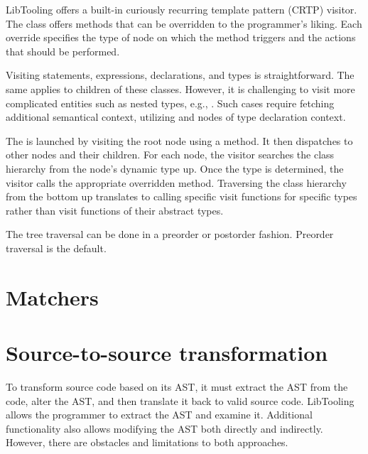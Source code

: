 LibTooling offers a built-in curiously recurring template pattern 
(CRTP) visitor. 
The class  offers  methods that 
can be overridden to the programmer's liking. 
Each override specifies the type of node on which the method 
triggers and the actions that should be performed.


Visiting statements, expressions, declarations, 
and types is straightforward. 
The same applies to children of these classes. 
However, it is challenging to visit more complicated entities 
such as nested types, e.g., . 
Such cases require fetching additional semantical context, 
utilizing  and nodes of type declaration context.


The  is launched by visiting the root node using 
a  method. 
It then dispatches to other nodes and their children. 
For each node, the visitor searches the class hierarchy from 
the node's dynamic type up. 
Once the type is determined, the visitor calls the appropriate 
overridden  method. 
Traversing the class hierarchy from the bottom up 
translates to calling specific visit functions for specific types 
rather than visit functions of their abstract types.

The tree traversal can be done in a preorder or postorder fashion. 
Preorder traversal is the default.

\section{Matchers}


\section{Source-to-source transformation}

To transform source code based on its AST, it must extract the AST 
from the code, alter the AST, and then translate it back to valid 
source code. 
LibTooling allows the programmer to extract the AST and examine it. 
Additional functionality also allows modifying the AST both directly 
and indirectly. 
However, there are obstacles and limitations to both approaches. 

